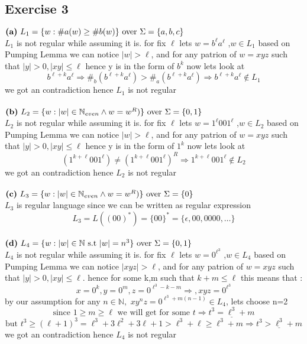 \documentclass[12pt]{article}
\newcommand{\N}{\mathbb{N}}
\begin{document}
\subsection*{Exercise 3}
$\text{\textbf{(a)} } L_1 = \lbrace w : \# a(w) \geq \# b(w)\rbrace  \text{ over } \Sigma =  \lbrace a, b, c\rbrace$\\
  $L_1$ is not regular while assuming it is. for fix $\ell$ lets $w=b^\ell a^\ell$ ,$w\in L_1$ based on Pumping Lemma we can notice $|w|>\ell$, and for any patrion of $w=xyz$ such that $|y|>0,|xy|\leq \ell$ hence y is in the form  of $b^k$ now lets look at 
  \[
  b^{\ell+k}a^{\ell}\Rightarrow \#_{b}(b^{\ell+k}a^{\ell})>\#_{a}(b^{\ell+k}a^{\ell})\Rightarrow b^{\ell+k}a^{\ell} \notin L_1
  \]
we got an contradiction hence $L_1$ is not regular\\\\
$\text{\textbf{(b)} } L_2 = \lbrace w : |w| \in \N_{even} \wedge w=w^R )\rbrace  \text{ over } \Sigma =  \lbrace 0,1 \rbrace$\\
$L_2$ is not regular while assuming it is. for fix $\ell$ lets $w=1^\ell001^\ell$ ,$w\in L_2$ based on Pumping Lemma we can notice $|w|>\ell$, and for any patrion of $w=xyz$ such that $|y|>0,|xy|\leq \ell$ hence y is in the form  of $1^k$ now lets look at
  \[
  (1^{k+\ell}001^\ell)\neq (1^{k+\ell}001^\ell)^R\Rightarrow 1^{k+\ell}001^\ell \notin L_2
  \]
we got an contradiction hence $L_2$ is not regular\\\\
$\text{\textbf{(c)} } L_3 = \lbrace w : |w| \in \N_{even} \wedge w=w^R )\rbrace  \text{ over } \Sigma =  \lbrace 0 \rbrace$\\ 
$L_3$ is regular language since we can be written  as regular expression
\[
L_3=L((00)^*)=\lbrace 00\rbrace^*=\lbrace\epsilon ,00,0000,\dots\rbrace
\]\\
$\text{\textbf{(d)} } L_4 = \lbrace w : |w| \in \N \text{ s.t } |w|=n^3 \rbrace  \text{ over } \Sigma =  \lbrace 0,1 \rbrace$\\ 
  $L_4$ is not regular while assuming it is. for fix $\ell$ lets $w=0^{\ell^3} $ ,$w\in L_4$ based on Pumping Lemma we can notice $|xyz|>\ell$, and for any patrion of $w=xyz$ such that $|y|>0,|xy|\leq \ell$. hence for some k,m such that $k+m\leq \ell$ this means that :
  \[x=0^k,y=0^m,z=0^{\ell^3-k-m}\Rightarrow,xyz=0^{\ell^3}
  \] 
by  our assumption for any $n\in \N,$ $ xy^nz=0^{\ell^3+m(n-1)}\in L_4$, lets choose n=2  \[\text{since $1\geq m \geq \ell$ we will get for some $t$}
\Rightarrow \underline{t^3=\ell^3+m }
\]
\[\text{but } t^3\geq(\ell+1)^3=\ell^3+3\ell^2+3\ell+1>
\ell^3+\ell\geq\ell^3+m\Rightarrow \underline{t^3>\ell^3+m}
\]
we got an contradiction hence $L_4$ is not regular
\end{document}
